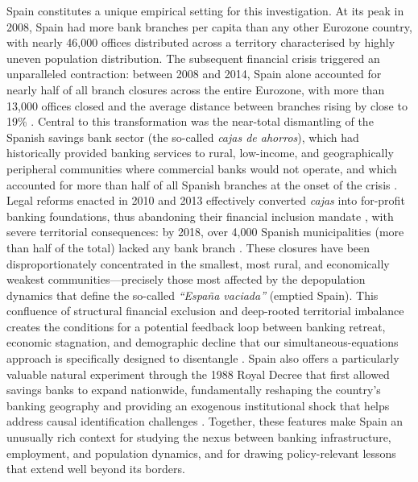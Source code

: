 \documentclass[a4paper,11pt,oneside]{article}
\begin{document}
Spain constitutes a unique empirical setting for this investigation. At its peak in 2008, Spain had more bank branches per capita than any other Eurozone country, with nearly 46,000 offices distributed across a territory characterised by highly uneven population distribution. The subsequent financial crisis triggered an unparalleled contraction: between 2008 and 2014, Spain alone accounted for nearly half of all branch closures across the entire Eurozone, with more than 13,000 offices closed and the average distance between branches rising by close to 19\% \citep{martin2019financial}. Central to this transformation was the near-total dismantling of the Spanish savings bank sector (the so-called \textsl{cajas de ahorros}), which had historically provided banking services to rural, low-income, and geographically peripheral communities where commercial banks would not operate, and which accounted for more than half of all Spanish branches at the onset of the crisis \citep{bernad.fuentelsaz.gomez2008deregulation,alama_conesa_forte_tortosa_jas}. Legal reforms enacted in 2010 and 2013 effectively converted \textsl{cajas} into for-profit banking foundations, thus abandoning their financial inclusion mandate \citep{martin2019financial}, with severe territorial consequences: by 2018, over 4,000 Spanish municipalities (more than half of the total) lacked any bank branch \citep{camacho2021financial}. These closures have been disproportionately concentrated in the smallest, most rural, and economically weakest communities---precisely those most affected by the depopulation dynamics that define the so-called \textsl{``España vaciada''} (emptied Spain). This confluence of structural financial exclusion and deep-rooted territorial imbalance creates the conditions for a potential feedback loop between banking retreat, economic stagnation, and demographic decline that our simultaneous-equations approach is specifically designed to disentangle \citep{martin2025closes,jimenez2022bank}. Spain also offers a particularly valuable natural experiment through the 1988 Royal Decree that first allowed savings banks to expand nationwide, fundamentally reshaping the country's banking geography and providing an exogenous institutional shock that helps address causal identification challenges \citep{illueca.pastor.tortosa.FUNCAS-05,illueca2008liberalization}. Together, these features make Spain an unusually rich context for studying the nexus between banking infrastructure, employment, and population dynamics, and for drawing policy-relevant lessons that extend well beyond its borders.
\end{document}
